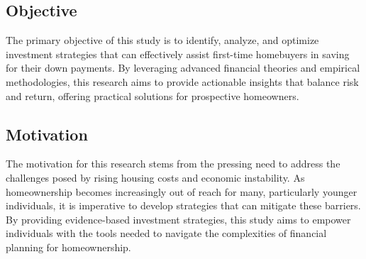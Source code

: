 \subsection{Objective}
The primary objective of this study is to identify, analyze, and optimize investment strategies that can effectively assist first-time homebuyers in saving for their down payments. By leveraging advanced financial theories and empirical methodologies, this research aims to provide actionable insights that balance risk and return, offering practical solutions for prospective homeowners.

\subsection{Motivation}
The motivation for this research stems from the pressing need to address the challenges posed by rising housing costs and economic instability. As homeownership becomes increasingly out of reach for many, particularly younger individuals, it is imperative to develop strategies that can mitigate these barriers. By providing evidence-based investment strategies, this study aims to empower individuals with the tools needed to navigate the complexities of financial planning for homeownership.

\newpage
